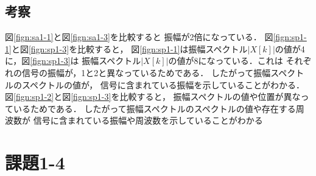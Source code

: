 \documentclass[11pt, a4paper, titlepage]{ltjsarticle}
\begin{document}
\subsection*{考察}
図\ref*{fign:sa1-1}と図\ref*{fign:sa1-3}を比較すると
振幅が2倍になっている．
図\ref*{fign:sp1-1}と図\ref*{fign:sp1-3}を比較すると，
図\ref*{fign:sp1-1}は振幅スペクトル$|X[k]|$の値が4に，図\ref*{fign:sp1-3}は
振幅スペクトル$|X[k]|$の値が8になっている．これは
それぞれの信号の振幅が，1と2と異なっているためである．
したがって振幅スペクトルのスペクトルの値が，
信号に含まれている振幅を示していることがわかる．
図\ref*{fign:sp1-2}と図\ref*{fign:sp1-3}を比較すると，
振幅スペクトルの値や位置が異なっているためである．
したがって振幅スペクトルのスペクトルの値や存在する周波数が
信号に含まれている振幅や周波数を示していることがわかる
\newpage
\section*{課題1-4}
\end{document}
